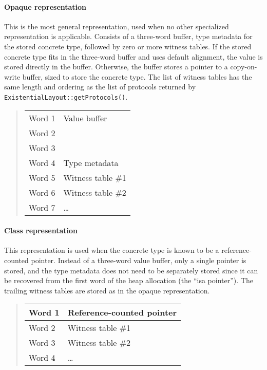 \documentclass[../generics]{subfiles}
\begin{document}
\paragraph{Opaque representation} This is the most general representation, used when no other specialized representation is applicable. Consists of a three-word buffer, type metadata for the stored concrete type, followed by zero or more witness tables. If the stored concrete type fits in the three-word buffer and uses default alignment, the value is stored directly in the buffer. Otherwise, the buffer stores a pointer to a copy-on-write buffer, sized to store the concrete type. The list of witness tables has the same length and ordering as the list of protocols returned by \texttt{ExistentialLayout::getProtocols()}.

\begin{quote}
\begin{tabular}{|l|l|}
\hline
Word 1&Value buffer\\
Word 2&\\
Word 3&\\
\hline
\hline
Word 4&Type metadata\\
\hline
\hline
Word 5&Witness table \#1\\
Word 6&Witness table \#2\\
Word 7&\ldots\\
\hline
\end{tabular}
\end{quote}

\paragraph{Class representation} This representation is used when the concrete type is known to be a reference-counted pointer. Instead of a three-word value buffer, only a single pointer is stored, and the type metadata does not need to be separately stored since it can be recovered from the first word of the heap allocation (the ``isa pointer''). The trailing witness tables are stored as in the opaque representation.

\begin{quote}
\begin{tabular}{|l|l|}
\hline
Word 1&Reference-counted pointer\\
\hline
\hline
Word 2&Witness table \#1\\
Word 3&Witness table \#2\\
Word 4&\ldots\\
\hline
\end{tabular}
\end{quote}
\end{document}
